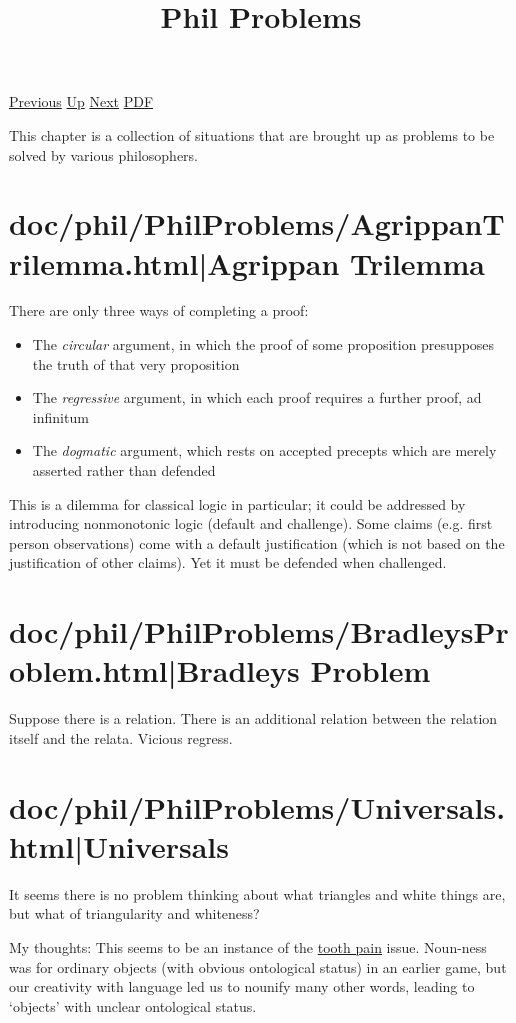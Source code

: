 \documentclass[12pt,a4paper]{report}
\begin{document}
 \href{doc/phil/People.html}{Previous} 
 \href{doc/phil.html}{Up} 
 \href{doc/phil/PhilSituations.html}{Next} 
 \href{doc/phil/PhilProblems.pdf}{PDF} 
\title{Phil Problems}

\tableofcontents
This chapter is a collection of situations that are brought up as problems to be solved by various philosophers.

\part{doc/phil/PhilProblems/AgrippanTrilemma.html|Agrippan Trilemma}
There are only three ways of completing a proof:
\begin{itemize}
    \item The \emph{circular} argument, in which the proof of some proposition presupposes the truth of that very proposition
    \item The \emph{regressive} argument, in which each proof requires a further proof, ad infinitum
    \item The \emph{dogmatic} argument, which rests on accepted precepts which are merely asserted rather than defended
\end{itemize}

This is a dilemma for classical logic in particular; it could be addressed by introducing nonmonotonic logic (default and challenge). Some claims (e.g. first person observations) come with a default justification (which is not based on the justification of other claims). Yet it must be defended when challenged.
\part{doc/phil/PhilProblems/BradleysProblem.html|Bradleys Problem}
Suppose there is a relation. There is an additional relation between the relation itself and the relata. Vicious regress.

\part{doc/phil/PhilProblems/Universals.html|Universals}
It seems there is no problem thinking about what triangles and white things are, but what of triangularity and whiteness?

My thoughts: This seems to be an instance of the \href{doc/phil/PhilSituations/ToothPain}{tooth pain} issue. Noun-ness was for ordinary objects (with obvious ontological status) in an earlier game, but our creativity with language led us to nounify many other words, leading to `objects' with unclear ontological status.
\end{document}
